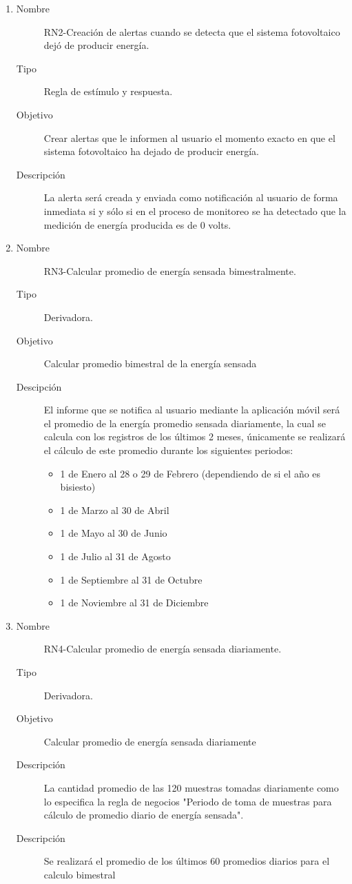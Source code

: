\begin{enumerate}[label=RN\arabic*.]
    \item \label{RN2}
		\begin{description}
			\item[Nombre] RN2-Creación de alertas cuando se detecta que el sistema fotovoltaico dejó de producir energía.
			\item[Tipo] Regla de estímulo y respuesta.
			\item[Objetivo] Crear alertas que le informen al usuario el momento exacto en que el sistema fotovoltaico ha dejado de producir energía.
			\item[Descripción] La alerta será creada y enviada como notificación al usuario de forma inmediata si y sólo si en el proceso de monitoreo se ha detectado que la medición de energía producida es de 0 volts.  
    		\end{description}
\item \label{RN3}
		\begin{description}
			\item[Nombre] RN3-Calcular promedio de energía sensada bimestralmente.
			\item[Tipo] Derivadora.
			\item[Objetivo] Calcular promedio bimestral de la energía sensada
			\item[Descipción] El informe que se notifica al usuario mediante la aplicación móvil será el promedio de la energía promedio sensada diariamente, la cual se calcula con los registros de los últimos 2 meses, únicamente se realizará el cálculo de este promedio durante los siguientes periodos:
			\begin{itemize}
				\item 1 de Enero al 28 o 29 de Febrero (dependiendo de si el año es bisiesto)
				\item 1 de Marzo al 30 de Abril
				\item 1 de Mayo al 30 de Junio
				\item 1 de Julio al 31 de Agosto
				\item 1 de Septiembre al 31 de Octubre
				\item 1 de Noviembre al 31 de Diciembre
			\end{itemize}
		\end{description}

\item \label{RN4}
		\begin{description}
			\item[Nombre] RN4-Calcular promedio de energía sensada diariamente.
			\item[Tipo] Derivadora.
			\item[Objetivo] Calcular promedio de energía sensada diariamente
			\item[Descripción] La cantidad promedio de las 120 muestras tomadas diariamente como lo especifica la regla de negocios "Periodo de toma de muestras para cálculo de promedio diario de energía sensada".
			\item[Descripción] Se realizará el promedio de los últimos 60 promedios diarios para el calculo bimestral
		\end{description}


\end{enumerate}

